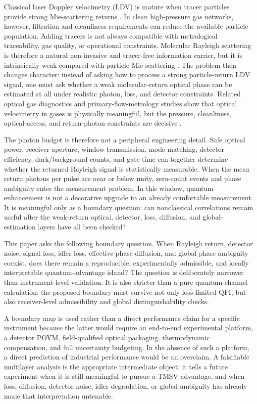 \documentclass[a4paper,11pt]{article}
\numberwithin{equation}{section}
\begin{document}
Classical laser Doppler velocimetry (LDV) is mature when tracer particles provide strong Mie-scattering returns \cite{Durst1981,Albrecht2003,Tropea2007}. In clean high-pressure gas networks, however, filtration and cleanliness requirements can reduce the available particle population. Adding tracers is not always compatible with metrological traceability, gas quality, or operational constraints. Molecular Rayleigh scattering is therefore a natural non-invasive and tracer-free information carrier, but it is intrinsically weak compared with particle Mie scattering \cite{Miles2001,Gu2014,Witschas2011}. The problem then changes character: instead of asking how to process a strong particle-return LDV signal, one must ask whether a weak molecular-return optical phase can be estimated at all under realistic photon, loss, and detector constraints. Related optical gas diagnostics and primary-flow-metrology studies show that optical velocimetry in gases is physically meaningful, but the pressure, cleanliness, optical-access, and return-photon constraints are decisive \cite{Mickan2014,Maury2018}.

The photon budget is therefore not a peripheral engineering detail. Safe optical power, receiver aperture, window transmission, mode matching, detector efficiency, dark/background counts, and gate time can together determine whether the returned Rayleigh signal is statistically measurable. When the mean return photons per pulse are near or below unity, zero-count events and phase ambiguity enter the measurement problem. In this window, quantum enhancement is not a decorative upgrade to an already comfortable measurement. It is meaningful only as a boundary question: can nonclassical correlations remain useful after the weak-return optical, detector, loss, diffusion, and global-estimation layers have all been checked?

This paper asks the following boundary question. When Rayleigh return, detector noise, signal loss, idler loss, effective phase diffusion, and global phase ambiguity coexist, does there remain a reproducible, experimentally admissible, and locally interpretable quantum-advantage island? The question is deliberately narrower than instrument-level validation. It is also stricter than a pure quantum-channel calculation: the proposed boundary must survive not only loss-limited QFI, but also receiver-level admissibility and global distinguishability checks.

A boundary map is used rather than a direct performance claim for a specific instrument because the latter would require an end-to-end experimental platform, a detector POVM, field-qualified optical packaging, thermodynamic compensation, and full uncertainty budgeting. In the absence of such a platform, a direct prediction of industrial performance would be an overclaim. A falsifiable multilayer analysis is the appropriate intermediate object: it tells a future experiment when it is still meaningful to pursue a TMSV advantage, and when loss, diffusion, detector noise, idler degradation, or global ambiguity has already made that interpretation untenable.
\end{document}
